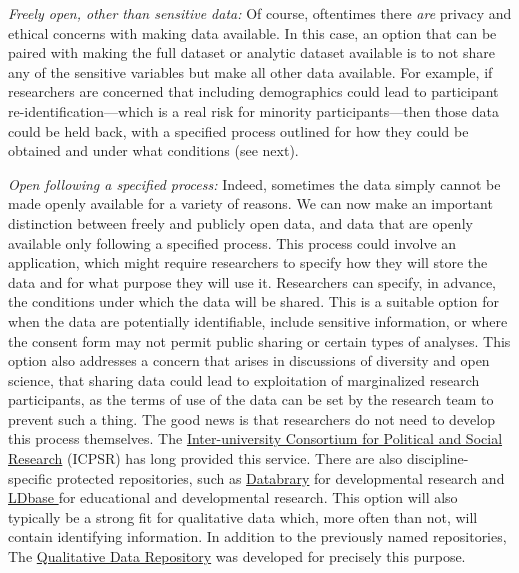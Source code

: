 \documentclass[authordate, empirical]{jote-new-article}
\begin{document}
\emph{Freely open, other than sensitive data: }Of course, oftentimes there \emph{are} privacy and ethical concerns with making data available. In this case, an option that can be paired with making the full dataset or analytic dataset available is to not share any of the sensitive variables but make all other data available. For example, if researchers are concerned that including demographics could lead to participant re-identification—which is a real risk for minority participants—then those data could be held back, with a specified process outlined for how they could be obtained and under what conditions (see next).







\emph{Open following a specified process:} Indeed, sometimes the data simply cannot be made openly available for a variety of reasons. We can now make an important distinction between freely and publicly open data, and data that are openly available only following a specified process. This process could involve an application, which might require researchers to specify how they will store the data and for what purpose they will use it. Researchers can specify, in advance, the conditions under which the data will be shared. This is a suitable option for when the data are potentially identifiable, include sensitive information, or where the consent form may not permit public sharing or certain types of analyses. This option also addresses a concern that arises in discussions of diversity and open science, that sharing data could lead to exploitation of marginalized research participants, as the terms of use of the data can be set by the research team to prevent such a thing. The good news is that researchers do not need to develop this process themselves. The \href{https://www.icpsr.umich.edu/web/pages/}{Inter-university Consortium for Political and Social Research} (ICPSR) has long provided this service. There are also discipline-specific protected repositories, such as \href{https://nyu.databrary.org/}{Databrary} \parencites{Gilmore2016} for developmental research and \href{https://ldbase.org/}{LDbase }\parencites{Hart2020} for educational and developmental research. This option will also typically be a strong fit for qualitative data which, more often than not, will contain identifying information. In addition to the previously named repositories, The \href{https://qdr.syr.edu/}{Qualitative Data Repository} was developed for precisely this purpose.
\end{document}
